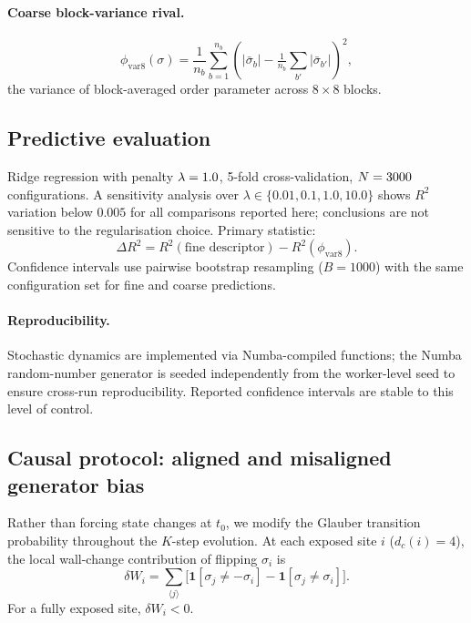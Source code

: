 \documentclass[aps,pre,preprint,superscriptaddress,showpacs]{revtex4-2}
\begin{document}
\paragraph{Coarse block-variance rival.}
\begin{equation}
\phi_{\mathrm{var8}}(\sigma) =
\frac{1}{n_b}\sum_{b=1}^{n_b}
\!\left(|\bar\sigma_b| - \tfrac{1}{n_b}\sum_{b'}|\bar\sigma_{b'}|\right)^2,
\end{equation}
the variance of block-averaged order parameter across $8\times 8$ blocks.

\subsection{Predictive evaluation}

Ridge regression with penalty $\lambda=1.0$, 5-fold cross-validation,
$N=3000$ configurations.
A sensitivity analysis over $\lambda\in\{0.01,0.1,1.0,10.0\}$ shows
$R^2$ variation below $0.005$ for all comparisons reported here;
conclusions are not sensitive to the regularisation choice.
Primary statistic:
\begin{equation}
\Delta R^2 = R^2(\text{fine descriptor}) - R^2(\phi_{\mathrm{var8}}).
\end{equation}
Confidence intervals use pairwise bootstrap resampling ($B=1000$)
with the same configuration set for fine and coarse predictions.

\paragraph{Reproducibility.}
Stochastic dynamics are implemented via Numba-compiled functions; the Numba random-number generator is seeded independently from the worker-level seed to ensure cross-run reproducibility. Reported confidence intervals are stable to this level of control.

\subsection{Causal protocol: aligned and misaligned generator bias}
\label{sec:causal_protocol}

Rather than forcing state changes at $t_0$, we modify the Glauber
transition probability throughout the $K$-step evolution.
At each exposed site $i$ ($d_c(i)=4$), the local wall-change contribution
of flipping $\sigma_i$ is
\begin{equation}
\delta W_i = \sum_{\langle j\rangle}
\bigl[\mathbf{1}[\sigma_j \neq -\sigma_i]
- \mathbf{1}[\sigma_j \neq \sigma_i]\bigr].
\end{equation}
For a fully exposed site, $\delta W_i < 0$.
\end{document}
